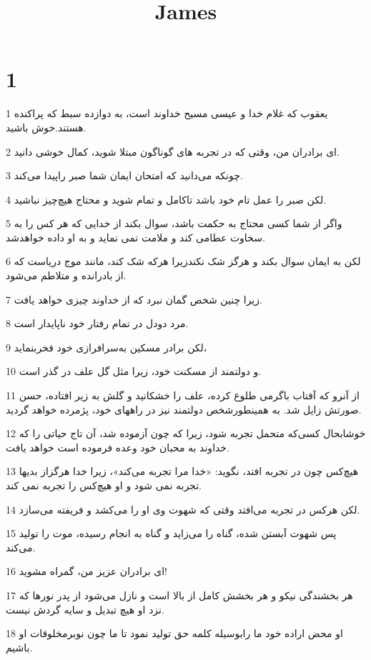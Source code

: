 

\title{James}


\chapter{1}

\par 1 یعقوب که غلام خدا و عیسی مسیح خداوند است، به دوازده سبط که پراکنده هستند.خوش باشید.
\par 2 ‌ای برادران من، وقتی که در تجربه های گوناگون مبتلا شوید، کمال خوشی دانید.
\par 3 چونکه می‌دانید که امتحان ایمان شما صبر راپیدا می‌کند.
\par 4 لکن صبر را عمل تام خود باشد تاکامل و تمام شوید و محتاج هیچ‌چیز نباشید.
\par 5 واگر از شما کسی محتاج به حکمت باشد، سوال بکند از خدایی که هر کس را به سخاوت عطامی کند و ملامت نمی نماید و به او داده خواهدشد.
\par 6 لکن به ایمان سوال بکند و هرگز شک نکندزیرا هرکه شک کند، مانند موج دریاست که از بادرانده و متلاطم می‌شود.
\par 7 زیرا چنین شخص گمان نبرد که از خداوند چیزی خواهد یافت.
\par 8 مرد دودل در تمام رفتار خود ناپایدار است.
\par 9 لکن برادر مسکین به‌سرافرازی خود فخربنماید،
\par 10 و دولتمند از مسکنت خود، زیرا مثل گل علف در گذر است.
\par 11 از آنرو که آفتاب باگرمی طلوع کرده، علف را خشکانید و گلش به زیر افتاده، حسن صورتش زایل شد. به همینطورشخص دولتمند نیز در راههای خود، پژمرده خواهد گردید.
\par 12 خوشابحال کسی‌که متحمل تجربه شود، زیرا که چون آزموده شد، آن تاج حیاتی را که خداوند به محبان خود وعده فرموده است خواهد یافت.
\par 13 هیچ‌کس چون در تجربه افتد، نگوید: «خدا مرا تجربه می‌کند»، زیرا خدا هرگزاز بدیها تجربه نمی شود و او هیچ‌کس را تجربه نمی کند.
\par 14 لکن هرکس در تجربه می‌افتد وقتی که شهوت وی او را می‌کشد و فریفته می‌سازد.
\par 15 پس شهوت آبستن شده، گناه را می‌زاید و گناه به انجام رسیده، موت را تولید می‌کند.
\par 16 ‌ای برادران عزیز من، گمراه مشوید!
\par 17 هر بخشندگی نیکو و هر بخشش کامل از بالا است و نازل می‌شود از پدر نورها که نزد او هیچ تبدیل و سایه گردش نیست.
\par 18 او محض اراده خود ما رابوسیله کلمه حق تولید نمود تا ما چون نوبرمخلوقات او باشیم.
